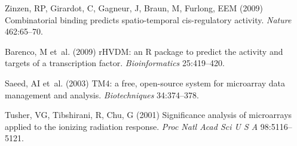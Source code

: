 \documentclass{pnastwo}
\begin{document}
\begin{article}
\begin{thebibliography}{10}
Zinzen, RP, Girardot, C, Gagneur, J, Braun, M, Furlong, EEM
\newblock (2009) Combinatorial binding predicts spatio-temporal cis-regulatory
  activity.
\newblock \emph{Nature} 462:65--70.

Barenco, M et~al.
\newblock (2009) {rHVDM}: an {R} package to predict the activity and targets of
  a transcription factor.
\newblock \emph{Bioinformatics} 25:419--420.

Saeed, AI et~al.
\newblock (2003) {TM4}: a free, open-source system for microarray data
  management and analysis.
\newblock \emph{Biotechniques} 34:374--378.

Tusher, VG, Tibshirani, R, Chu, G
\newblock (2001) Significance analysis of microarrays applied to the ionizing
  radiation response.
\newblock \emph{Proc Natl Acad Sci U S A} 98:5116--5121.

\end{thebibliography}

%
\end{article}

\end{document}
